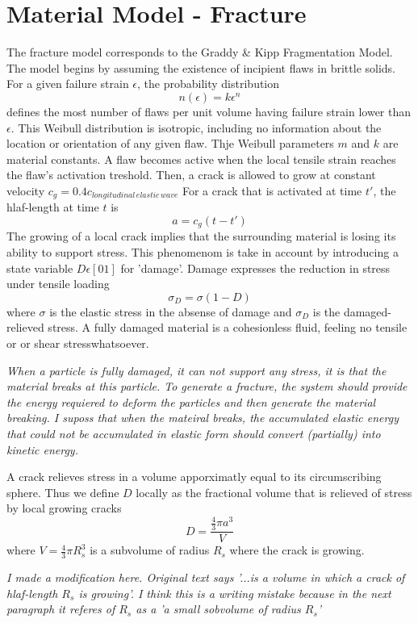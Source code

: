 \documentclass[10pt, twocolumn]{thesis}
\begin{document}
\chapter{Material Model - Fracture}
The fracture model corresponds to the Graddy \& Kipp Fragmentation Model.\cite{benz95}\\
The model begins by assuming the existence of incipient flaws in brittle solids.  For a given failure strain $\epsilon$, the probability distribution 
\[n(\epsilon)=k\epsilon^n\]
defines the most number of flaws per unit volume having failure strain lower than $\epsilon$. This Weibull distribution is isotropic, including no information about the location or orientation of any given flaw. Thje Weibull parameters $m$ and $k$ are material constants.
A flaw becomes active when the local tensile strain reaches the flaw's activation treshold. Then, a crack is allowed to grow at constant velocity\cite{benz95} $c_g=0.4c_{longitudinal\, elastic\, wave}$
For a crack that is activated at time $t'$, the hlaf-length at time $t$ is
\[a=c_g(t-t')\]
The growing of a local crack implies that the surrounding material is losing its ability to support stress. This phenomenom is take in account by introducing a state variable $D \epsilon[0 1]$ for 'damage'. Damage expresses the reduction in stress under tensile loading\cite{benz95}
\[\sigma_D=\sigma(1-D)\]
where $\sigma$ is the elastic stress in the absense of damage and $\sigma_D$ is the damaged-relieved stress. A fully damaged material is a cohesionless fluid, feeling no tensile or or shear stresswhatsoever.
\begin{scriptsize}
\textit{When a particle is fully damaged, it can not support any stress, it is that the material breaks at this particle. To generate a fracture, the system should provide the energy requiered to deform the particles and then generate the material breaking. I suposs that when the mateiral breaks, the accumulated elastic energy that could not be accumulated in elastic form should convert (partially) into kinetic energy.}
\end{scriptsize}
A crack relieves stress in a volume apporximatly equal to its circumscribing sphere. Thus we define $D$ locally as the fractional volume that is relieved of stress by local growing cracks
\[D=\frac{\frac{4}{3}\pi a^3}{V}\]
where $V=\frac{4}{3}\pi R_s^3$ is a subvolume of radius $R_s$ where the crack is growing.
\begin{scriptsize}
\textit{I made a modification here. Original text\cite{benz95} says '...is a volume in which a crack of hlaf-length $R_s$ is growing'. I think this is a writing mistake because in the next paragraph it referes of $R_s$ as a 'a small sobvolume of radius $R_s$'\\}
\end{scriptsize}
\end{document}
